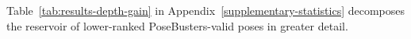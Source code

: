 
Table~\ref{tab:results-depth-gain} in Appendix~\ref{supplementary-statistics} decomposes the reservoir of lower-ranked PoseBusters-valid poses in greater detail. 



